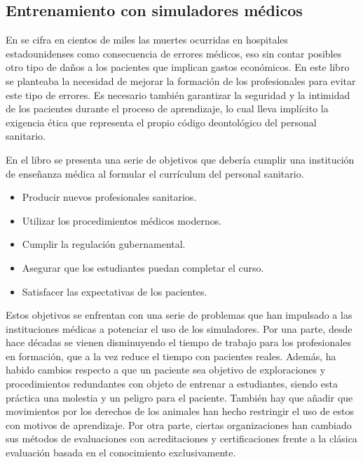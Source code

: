
\subsection{Entrenamiento con simuladores médicos}
\label{art:entrenamiento}



En \cite{donaldson2000err} se cifra en cientos de miles las muertes ocurridas en hospitales estadounidenses como consecuencia de errores médicos, eso sin contar posibles otro tipo de daños a los pacientes que implican gastos económicos. En este libro se planteaba la necesidad de mejorar la formación de los profesionales para evitar este tipo de errores. 
Es necesario también garantizar la seguridad y la intimidad de los pacientes durante el proceso de aprendizaje, lo cual lleva implícito la exigencia ética que representa el propio código deontológico del personal sanitario. 

En el libro \cite{dent2017practical} se presenta una serie de objetivos que debería cumplir una institución de enseñanza médica al formular el currículum del personal sanitario.
\begin{itemize}
    \item Producir nuevos profesionales sanitarios.
    \item Utilizar los procedimientos médicos modernos.
    \item Cumplir la regulación gubernamental.
    \item Asegurar que los estudiantes puedan completar el curso.
    \item Satisfacer las expectativas de los pacientes.
\end{itemize}

Estos objetivos se enfrentan con una serie de problemas que han impulsado a las instituciones médicas a potenciar el uso de los simuladores.
Por una parte,  desde hace décadas se vienen disminuyendo el tiempo de trabajo para los profesionales en formación, que a la vez reduce el tiempo con pacientes reales. Además,  ha habido cambios respecto a que un paciente sea objetivo de exploraciones y procedimientos redundantes con objeto de entrenar a estudiantes, siendo esta práctica una molestia y un peligro para el paciente. También hay que añadir que movimientos por los derechos de los animales han hecho restringir el uso de estos con motivos de aprendizaje. Por otra parte, ciertas organizaciones han cambiado sus métodos de evaluaciones con acreditaciones y certificaciones frente a la clásica evaluación basada en el conocimiento exclusivamente.

